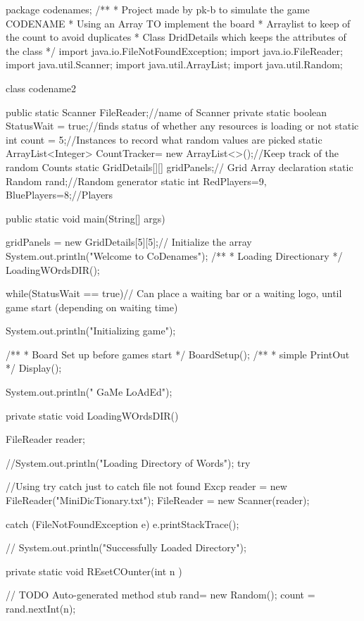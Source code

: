 package codenames;
/**
 * Project made by pk-b to simulate the game CODENAME
 * Using an Array TO implement the board
 * Arraylist to keep of the count to avoid duplicates
 * Class DridDetails which keeps the attributes of the class
 */
import java.io.FileNotFoundException;
import java.io.FileReader;
import java.util.Scanner;
import java.util.ArrayList;
import java.util.Random;

	class codename2  {
		
	public static Scanner FileReader;//name of Scanner
	private static boolean StatusWait = true;//finds status of whether any resources is loading or not
	static int count = 5;//Instances to record what random values are picked
	static ArrayList<Integer> CountTracker= new ArrayList<>();//Keep track of the random Counts
	static GridDetails[][] gridPanels;// Grid Array declaration
	static Random rand;//Random generator 
	static int RedPlayers=9, BluePlayers=8;//Players
	
	
	
		public static void main(String[] args)  {
		gridPanels	= new GridDetails[5][5];// Initialize the array
		System.out.println("Welcome to CoDenames");
		/**
		 * Loading Directionary
		 */
		LoadingWOrdsDIR();

		while(StatusWait == true)// Can place a waiting bar or a waiting logo, until game start (depending on waiting time)
		{
		System.out.println("Initializing game");
		
		/**
		 * Board Set up before games start
		 */
		BoardSetup();
		/**
		 * simple PrintOut
		 */
		Display();
		}
		
		System.out.println(" GaMe LoAdEd");
	
		
		

	}





	private static void LoadingWOrdsDIR() {
		FileReader reader;
		
		//System.out.println("Loading Directory of Words");
		try {//Using try catch just to catch file not found Excp
			reader = new FileReader("MiniDicTionary.txt");
			FileReader  = new Scanner(reader);

		} catch (FileNotFoundException e) {
			e.printStackTrace();
		} 
		
//	System.out.println("Successfully Loaded Directory");
	}





	private static void REsetCOunter(int n ) {
		// TODO Auto-generated method stub
		rand=  new Random();
		count = rand.nextInt(n); 
		
}}
